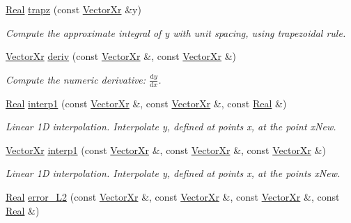 \begin{DoxyCompactItemize}
\hyperlink{typedefs_8h_a060b837c3b4486ee35317744156f3da2}{Real} \hyperlink{namespacenumerics_a24c140740098eaaa477d8ec263fbb441}{trapz} (const \hyperlink{typedefs_8h_aae6cee78ed9cd8f234ed8cb48682548a}{Vector\-Xr} \&y)
\begin{DoxyCompactList}\small\item\em Compute the approximate integral of {\itshape y} with unit spacing, using trapezoidal rule. \end{DoxyCompactList}\item 
\hyperlink{typedefs_8h_aae6cee78ed9cd8f234ed8cb48682548a}{Vector\-Xr} \hyperlink{namespacenumerics_a8ba4a40c596ac41f1438a34c1e91d19d}{deriv} (const \hyperlink{typedefs_8h_aae6cee78ed9cd8f234ed8cb48682548a}{Vector\-Xr} \&, const \hyperlink{typedefs_8h_aae6cee78ed9cd8f234ed8cb48682548a}{Vector\-Xr} \&)
\begin{DoxyCompactList}\small\item\em Compute the numeric derivative\-: $ \frac{\mathrm{d}y}{\mathrm{d}x} $. \end{DoxyCompactList}\item 
\hyperlink{typedefs_8h_a060b837c3b4486ee35317744156f3da2}{Real} \hyperlink{namespacenumerics_a05cd7efecfbd0a2771993848352e2e2d}{interp1} (const \hyperlink{typedefs_8h_aae6cee78ed9cd8f234ed8cb48682548a}{Vector\-Xr} \&, const \hyperlink{typedefs_8h_aae6cee78ed9cd8f234ed8cb48682548a}{Vector\-Xr} \&, const \hyperlink{typedefs_8h_a060b837c3b4486ee35317744156f3da2}{Real} \&)
\begin{DoxyCompactList}\small\item\em Linear 1\-D interpolation. Interpolate {\itshape y}, defined at points {\itshape x}, at the point {\itshape x\-New}. \end{DoxyCompactList}\item 
\hyperlink{typedefs_8h_aae6cee78ed9cd8f234ed8cb48682548a}{Vector\-Xr} \hyperlink{namespacenumerics_a5056bae21df918a09efaf5fb45300bff}{interp1} (const \hyperlink{typedefs_8h_aae6cee78ed9cd8f234ed8cb48682548a}{Vector\-Xr} \&, const \hyperlink{typedefs_8h_aae6cee78ed9cd8f234ed8cb48682548a}{Vector\-Xr} \&, const \hyperlink{typedefs_8h_aae6cee78ed9cd8f234ed8cb48682548a}{Vector\-Xr} \&)
\begin{DoxyCompactList}\small\item\em Linear 1\-D interpolation. Interpolate {\itshape y}, defined at points {\itshape x}, at the points {\itshape x\-New}. \end{DoxyCompactList}\item 
\hyperlink{typedefs_8h_a060b837c3b4486ee35317744156f3da2}{Real} \hyperlink{namespacenumerics_a7beb6807c580a205d0c23b4a9b23213f}{error\-\_\-\-L2} (const \hyperlink{typedefs_8h_aae6cee78ed9cd8f234ed8cb48682548a}{Vector\-Xr} \&, const \hyperlink{typedefs_8h_aae6cee78ed9cd8f234ed8cb48682548a}{Vector\-Xr} \&, const \hyperlink{typedefs_8h_aae6cee78ed9cd8f234ed8cb48682548a}{Vector\-Xr} \&, const \hyperlink{typedefs_8h_a060b837c3b4486ee35317744156f3da2}{Real} \&)

\end{DoxyCompactItemize}
